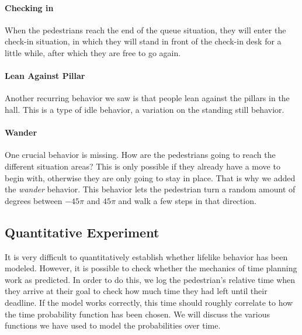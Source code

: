 \documentclass[11pt]{book}
\begin{document}
\paragraph{Checking in}
When the pedestrians reach the end of the queue situation, they will enter the check-in situation, in which they will stand in front of the check-in desk for a little while, after which they are free to go again.

\paragraph{Lean Against Pillar}
Another recurring behavior we saw is that people lean against the pillars in the hall. This is a type of idle behavior, a variation on the standing still behavior.

\paragraph{Wander}
One crucial behavior is missing. How are the pedestrians going to reach the different situation areas? This is only possible if they already have a move to begin with, otherwise they are only going to stay in place. That is why we added the \emph{wander} behavior. This behavior lets the pedestrian turn a random amount of degrees between $-45\pi$ and $45\pi$ and walk a few steps in that direction.

\subsection{Quantitative Experiment}
It is very difficult to quantitatively establish whether lifelike behavior has been modeled. However, it is possible to check whether the mechanics of time planning work as predicted. In order to do this, we log the pedestrian's relative time when they arrive at their goal to check how much time they had left until their deadline. If the model works correctly, this time should roughly correlate to how the time probability function has been chosen. We will discuss the various functions we have used to model the probabilities over time.
\end{document}
